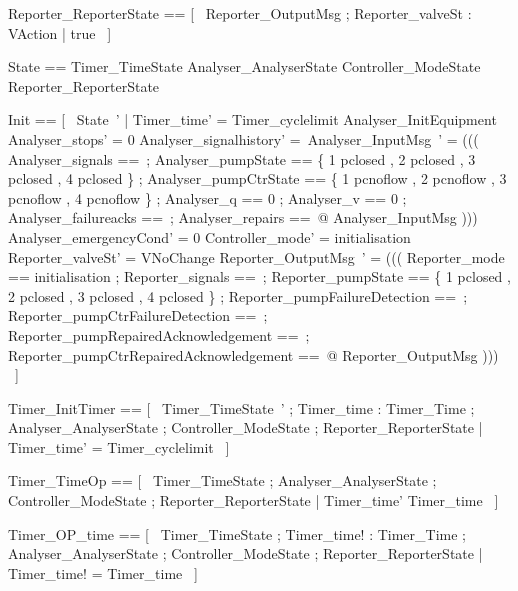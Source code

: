 \documentclass{article}
\begin{document}
\begin{zed}
	Reporter\_ReporterState == [~  Reporter\_OutputMsg ; Reporter\_valveSt : VAction | true  ~]
\end{zed}

\begin{zed}
	State == Timer\_TimeState \land Analyser\_AnalyserState \land Controller\_ModeState \land Reporter\_ReporterState
\end{zed}

\begin{zed}
    Init == [~  State~' | Timer\_time' = Timer\_cyclelimit \land Analyser\_InitEquipment \land Analyser\_stops' = 0 \land Analyser\_signalhistory' =~\emptyset[InputSignal] \land \theta Analyser\_InputMsg~' = ((( \LET Analyser\_signals ==~\emptyset[InputSignal] ; Analyser\_pumpState == \{ 1 \mapsto pclosed , 2 \mapsto pclosed , 3 \mapsto pclosed , 4 \mapsto pclosed \} ; Analyser\_pumpCtrState == \{ 1 \mapsto pcnoflow , 2 \mapsto pcnoflow , 3 \mapsto pcnoflow , 4 \mapsto pcnoflow \} ; Analyser\_q == 0 ; Analyser\_v == 0 ; Analyser\_failureacks ==~\emptyset[UnitFailure]; Analyser\_repairs ==~\emptyset[UnitFailure] @ \theta Analyser\_InputMsg ))) \land Analyser\_emergencyCond' = 0 \land Controller\_mode' = initialisation \land Reporter\_valveSt' = VNoChange \land \theta Reporter\_OutputMsg~' = ((( \LET Reporter\_mode == initialisation ; Reporter\_signals ==~\emptyset[OutputSignal] ; Reporter\_pumpState == \{ 1 \mapsto pclosed , 2 \mapsto pclosed , 3 \mapsto pclosed , 4 \mapsto pclosed \} ; Reporter\_pumpFailureDetection ==~\emptyset[UnitFailure] ; Reporter\_pumpCtrFailureDetection ==~\emptyset[UnitFailure] ; Reporter\_pumpRepairedAcknowledgement ==~\emptyset[UnitFailure] ; Reporter\_pumpCtrRepairedAcknowledgement ==~\emptyset[UnitFailure] @ \theta Reporter\_OutputMsg )))  ~]
\end{zed}

\begin{zed}
	Timer\_InitTimer == [~  Timer\_TimeState~' ; Timer\_time : Timer\_Time ; \Xi Analyser\_AnalyserState ; \Xi Controller\_ModeState ; \Xi Reporter\_ReporterState | Timer\_time' = Timer\_cyclelimit  ~]
\end{zed}

\begin{zed}
	Timer\_TimeOp == [~  \Delta Timer\_TimeState ; \Xi Analyser\_AnalyserState ; \Xi Controller\_ModeState ; \Xi Reporter\_ReporterState | Timer\_time' \geq Timer\_time  ~]
\end{zed}

\begin{zed}
	Timer\_OP\_time == [~  \Xi Timer\_TimeState ; Timer\_time! : Timer\_Time ; \Xi Analyser\_AnalyserState ; \Xi Controller\_ModeState ; \Xi Reporter\_ReporterState | Timer\_time! = Timer\_time  ~]
\end{zed}
\end{document}
